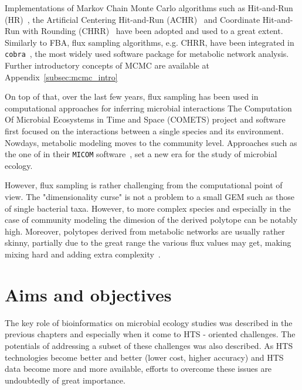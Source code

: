       Implementations of Markov Chain Monte Carlo algorithms such as 
      Hit-and-Run (HR)~\citep{smith84},  
      the Artificial Centering Hit-and-Run
      (ACHR)~\citep{kaufman1998direction} 
      and Coordinate Hit-and-Run with Rounding
      (CHRR)~\citep{haraldsdottir2017chrr}
      have been adopted and used to a great extent. 
      Similarly to FBA, flux sampling algorithms, e.g. CHRR, have been integrated in \texttt{cobra}~\citep{heirendt2019creation},
      the most widely used 
      software package for metabolic network analysis.
      Further introductory concepts of MCMC are available at Appendix~\ref{subsec:mcmc_intro}

      On top of that, over the last few years, flux sampling has been 
      used in computational approaches for inferring microbial interactions 
      The Computation Of Microbial Ecosystems in Time and Space (COMETS) project and software~\citep{dukovski2021metabolic}
      first focused on the interactions between a single species and its environment. 
      Nowdays, metabolic modeling moves to the community level. 
      Approaches such as the one of \citeauthor{diener2020micom} in their \texttt{MICOM}
      software~\citep{diener2020micom}, set a new era for the study of microbial ecology. 
      
      
      However, flux sampling is rather challenging from the computational point of view. 
      The "dimensionality curse" is not a problem to a small GEM such as those of single bacterial taxa.
      However, to more complex species and especially in the case of community modeling 
      the dimesion of the derived polytope can be notably high. 
      Moreover, polytopes derived from metabolic networks are usually rather skinny,
      partially due to the great range the various flux values may get, 
      making mixing hard and 
      adding extra complexity~\citep{Haraldsdottir17,schellenberger2009use}. 


      
\section{Aims and objectives}

   The key role of bioinformatics on microbial ecology studies
   was described in the previous chapters and especially 
   when it come to HTS - oriented challenges. 
   The potentials of addressing a subset of these challenges was also 
   described. 
   As HTS technologies become better and better 
   (lower cost, higher accuracy)
   and HTS data become more and more available, 
   efforts to overcome these issues 
   are undoubtedly of great importance. 


